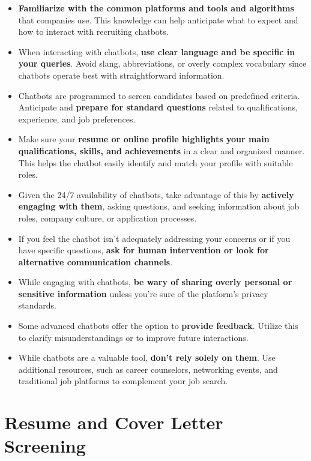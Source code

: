 \documentclass[
]{book}
\providecommand{\tightlist}{%
  \setlength{\itemsep}{0pt}\setlength{\parskip}{0pt}}
\begin{document}
\begin{itemize}
\tightlist
\item
  \textbf{Familiarize with the common platforms and tools and algorithms} that companies use. This knowledge can help anticipate what to expect and how to interact with recruiting chatbots.
\item
  When interacting with chatbots, \textbf{use clear language and be specific in your queries}. Avoid slang, abbreviations, or overly complex vocabulary since chatbots operate best with straightforward information.
\item
  Chatbots are programmed to screen candidates based on predefined criteria. Anticipate and \textbf{prepare for standard questions} related to qualifications, experience, and job preferences.
\item
  Make sure your \textbf{resume or online profile highlights your main qualifications, skills, and achievements} in a clear and organized manner. This helps the chatbot easily identify and match your profile with suitable roles.
\item
  Given the 24/7 availability of chatbots, take advantage of this by \textbf{actively engaging with them}, asking questions, and seeking information about job roles, company culture, or application processes.
\item
  If you feel the chatbot isn't adequately addressing your concerns or if you have specific questions, \textbf{ask for human intervention or look for alternative communication channels}.
\item
  While engaging with chatbots, \textbf{be wary of sharing overly personal or sensitive information} unless you're sure of the platform's privacy standards.
\item
  Some advanced chatbots offer the option to \textbf{provide feedback}. Utilize this to clarify misunderstandings or to improve future interactions.
\item
  While chatbots are a valuable tool, \textbf{don't rely solely on them}. Use additional resources, such as career counselors, networking events, and traditional job platforms to complement your job search.
\end{itemize}

\hypertarget{resume-and-cover-letter-screening}{%
\chapter{Resume and Cover Letter Screening}\label{resume-and-cover-letter-screening}}
\end{document}
